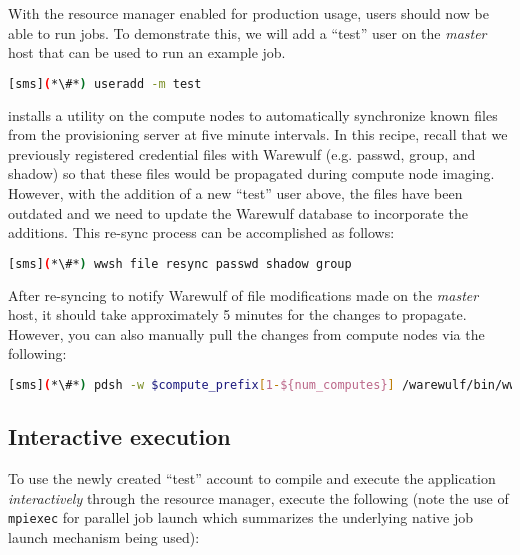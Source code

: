 With the resource manager enabled for production usage, users should now be
able to run jobs. To demonstrate this, we will add a ``test'' user on the {\em master}
host that can be used to run an example job.

\begin{lstlisting}[language=bash,keywords={}]
[sms](*\#*) useradd -m test
\end{lstlisting}

\Warewulf{} installs a utility on the compute nodes to automatically 
synchronize known files from the provisioning server at five minute intervals. In this
recipe, recall that we previously registered credential files with Warewulf (e.g. passwd,
group, and shadow) so that these files would be propagated during compute node
imaging. However, with the addition of a new ``test'' user above, the files
have been outdated and we need to update the Warewulf database to incorporate
the additions. This re-sync process can be accomplished as follows:

\begin{lstlisting}[language=bash,keywords={}]
[sms](*\#*) wwsh file resync passwd shadow group
\end{lstlisting}


\begin{center}
\begin{tcolorbox}[]
\small
After re-syncing to notify Warewulf of file modifications made on the {\em
master} host, it should take approximately 5 minutes for the changes to
propagate. However, you can also manually pull the changes from compute nodes
via the following:
\begin{lstlisting}[language=bash,keywords={}]
[sms](*\#*) pdsh -w $compute_prefix[1-${num_computes}] /warewulf/bin/wwgetfiles
\end{lstlisting}
\end{tcolorbox}
\end{center}




\subsection{Interactive execution}
To use the newly created ``test'' account to compile and execute the
application {\em interactively} through the resource manager, execute the
following (note the use of \texttt{mpiexec} for parallel job launch which summarizes
the underlying native job launch mechanism being used):

